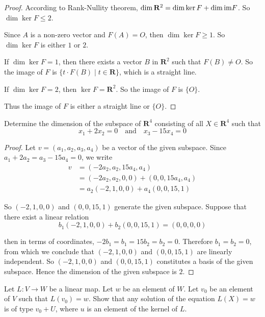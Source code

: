 \begin{proof}
    According to Rank-Nullity theorem, $\dim\mathbf{R}^{2} = \dim\ker F + \dim\text{im} F$. So $\dim\ker F \leq 2$.

    Since $A$ is a non-zero vector and $F(A) = O$, then $\dim\ker F \geq 1$. So $\dim\ker F$ is either $1$ or $2$.

    If $\dim\ker F = 1$, then there exists a vector $B$ in $\mathbf{R}^{2}$ such that $F(B) \ne O$. So the image of $F$ is $\{ t\cdot F(B) \mid t\in\mathbf{R} \}$, which is a straight line.

    If $\dim\ker F = 2$, then $\ker F = \mathbf{R}^{2}$. So the image of $F$ is $\{ O \}$.

    Thus the image of $F$ is either a straight line or $\{ O \}$.
\end{proof}

\begin{exercise}
    Determine the dimension of the subspace of $\mathbf{R}^{4}$ consisting of all $X\in\mathbf{R}^{4}$ such that
    \[
        x_{1} + 2x_{2} = 0 \quad\text{and}\quad x_{3} - 15x_{4} = 0
    \]
\end{exercise}

\begin{proof}
    Let $v = (a_{1}, a_{2}, a_{3}, a_{4})$ be a vector of the given subspace. Since $a_{1} + 2a_{2} = a_{3} - 15a_{4} = 0$, we write
    \begin{align*}
        v & = (-2a_{2}, a_{2}, 15a_{4}, a_{4})                \\
          & = (-2a_{2}, a_{2}, 0, 0) + (0, 0, 15a_{4}, a_{4}) \\
          & = a_{2}(-2, 1, 0, 0) + a_{4}(0, 0, 15, 1)
    \end{align*}

    So $(-2, 1, 0, 0)$ and $(0, 0, 15, 1)$ generate the given subspace. Suppose that there exist a linear relation
    \[
        b_{1}(-2, 1, 0, 0) + b_{2}(0, 0, 15, 1) = (0, 0, 0, 0)
    \]

    then in terms of coordinates, $-2b_{1} = b_{1} = 15b_{2} = b_{2} = 0$. Therefore $b_{1} = b_{2} = 0$, from which we conclude that $(-2, 1, 0, 0)$ and $(0, 0, 15, 1)$ are linearly independent. So $(-2, 1, 0, 0)$ and $(0, 0, 15, 1)$ constitutes a basis of the given subspace. Hence the dimension of the given subspace is $2$.
\end{proof}

\begin{exercise}
    Let $L: V \to W$ be a linear map. Let $w$ be an element of $W$. Let $v_{0}$ be an element of $V$ such that $L(v_{0}) = w$. Show that any solution of the equation $L(X) = w$ is of type $v_{0} + U$, where $u$ is an element of the kernel of $L$.
\end{exercise}

